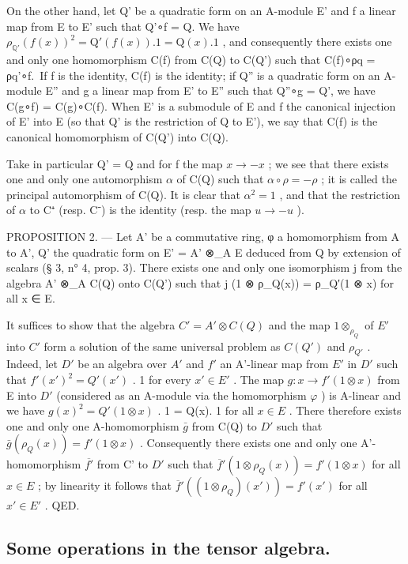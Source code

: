 On the other hand, let Q' be a quadratic form on an A-module E' and f a linear map from E to E' such that Q'∘f = Q. We have \(\rho_{\mathbb{Q}'}(f(x))^{2} = \mathrm{Q}'(f(x)).1 = \mathrm{Q}(x).1\) , and consequently there exists one and only one homomorphism C(f) from C(Q) to C(Q') such that C(f)∘ρq = ρq'∘f.~If f is the identity, C(f) is the identity; if Q'' is a quadratic form on an A-module E'' and g a linear map from E' to E'' such that Q''∘g = Q', we have C(g∘f) = C(g)∘C(f). When E' is a submodule of E and f the canonical injection of E' into E (so that Q' is the restriction of Q to E'), we say that C(f) is the canonical homomorphism of C(Q') into C(Q).

Take in particular Q' = Q and for f the map \(x \to -x\) ; we see that there exists one and only one automorphism \(\alpha\) of C(Q) such that \(\alpha \circ \rho = -\rho\) ; it is called the principal automorphism of C(Q). It is clear that \(\alpha^{2} = 1\) , and that the restriction of \(\alpha\) to C⁺ (resp. C⁻) is the identity (resp. the map \(u \to -u\) ).

PROPOSITION 2. --- Let A' be a commutative ring, φ a homomorphism from A to A', Q' the quadratic form on E' = A' ⊗\_A E deduced from Q by extension of scalars (§ 3, n° 4, prop. 3). There exists one and only one isomorphism j from the algebra A' ⊗\_A C(Q) onto C(Q') such that j (1 ⊗ ρ\_Q(x)) = ρ\_Q′(1 ⊗ x) for all x ∈ E.

It suffices to show that the algebra \(C' = A' \otimes C(Q)\) and the map \(1 \otimes_{\rho_{Q}}\) of \(E'\) into \(C'\) form a solution of the same universal problem as \(C(Q')\) and \(\rho_{Q'}\) . Indeed, let \(D'\) be an algebra over \(A'\) and \(f'\) an A'-linear map from \(E'\) in \(D'\) such that \(f'(x')^{2} = Q'(x')\) . 1 for every \(x' \in E'\) . The map \(g : x \to f'(1 \otimes x)\) from E into \(D'\) (considered as an A-module via the homomorphism \(\varphi\) ) is A-linear and we have \(g(x)^{2} = Q'(1 \otimes x)\) . 1 = Q(x). 1 for all \(x \in E\) . There therefore exists one and only one A-homomorphism \(\bar{g}\) from C(Q) to \(D'\) such that \(\bar{g}(\rho_{Q}(x)) = f'(1 \otimes x)\) . Consequently there exists one and only one A'-homomorphism \(\overline{f'}\) from C' to \(D'\) such that \(\overline{f}'(1 \otimes \rho_{Q}(x)) = f'(1 \otimes x)\) for all \(x \in E\) ; by linearity it follows that \(\overline{f}'((1 \otimes \rho_{Q})(x')) = f'(x')\) for all \(x' \in E'\) . QED.

\subsection{Some operations in the tensor algebra.}

